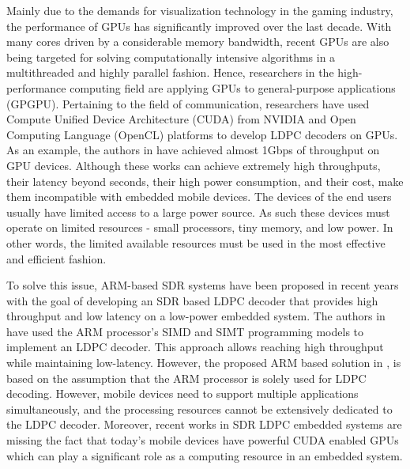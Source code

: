 \documentclass[10pt,a4paper]{article}
\begin{document}
Mainly due to the demands for visualization technology in the gaming industry, the performance of GPUs has significantly improved over the last decade. With many cores driven by a considerable memory bandwidth, recent GPUs are also being targeted for solving computationally intensive algorithms in a multithreaded and highly parallel fashion. Hence, researchers in the high-performance computing field are applying GPUs to general-purpose applications (GPGPU). Pertaining to the field of communication, researchers have used Compute Unified Device Architecture (CUDA) from NVIDIA \cite{art_gpu_0,art_cuda_openmp, art_memory_coalesced, art_optimize_0, art_layered1} and Open Computing Language (OpenCL) \cite{art_ldpc_OpenCl} platforms to develop LDPC decoders on GPUs. As an example, the authors in \cite{art_gpu_0} have achieved almost 1Gbps of throughput on GPU devices. Although these works can achieve extremely high throughputs, their latency beyond seconds, their high power consumption, and their cost, make them incompatible with embedded mobile devices. The devices of the end users usually have limited access to a large power source. As such these devices must operate on limited resources - small processors, tiny memory, and low power. In other words, the limited available resources must be used in the most effective and efficient fashion.

To solve this issue, ARM-based SDR systems have been proposed in recent years \cite{art_neon, art_ldpc_cpu0} with the goal of developing an SDR based LDPC decoder that provides high throughput and low latency on a low-power embedded system. The authors in \cite{art_neon} have used the ARM processor's SIMD and SIMT programming models to implement an LDPC decoder. This approach allows reaching high throughput while maintaining low-latency. However, the proposed ARM based solution in \cite{art_neon}, is based on the assumption that the ARM processor is solely used for LDPC decoding. However, mobile devices need to support multiple applications simultaneously, and the processing resources cannot be extensively dedicated to the LDPC decoder. Moreover, recent works in SDR LDPC embedded systems are missing the fact that today's mobile devices have powerful CUDA enabled GPUs which can play a significant role as a computing resource in an embedded system. %
\end{document}
